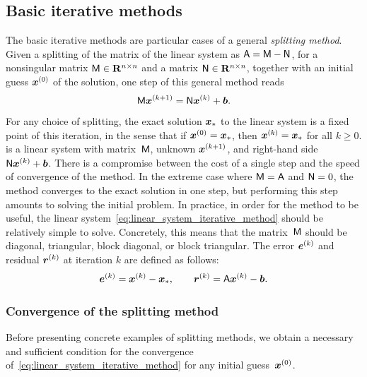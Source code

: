 \subsection{Basic iterative methods}%
\label{sub:basic_iterative_methods}
The basic iterative methods are particular cases of a general \emph{splitting method}.
Given a splitting of the matrix of the linear system as $\mathsf A = \mathsf M - \mathsf N$,
for a nonsingular matrix $\mathsf M \in \mathbf R^{n \times n}$ and a matrix $\mathsf N \in  \mathbf R^{n \times n}$,
together with an initial guess $\mathbf{\boldsymbol{x}}^{(0)}$ of the solution,
one step of this general method reads
\begin{equation}
    \label{eq:linear_system_iterative_method}
    \mathsf M \mathbf{\boldsymbol{x}}^{(k+1)} = \mathsf N \mathbf{\boldsymbol{x}}^{(k)} + \mathbf{\boldsymbol{b}}.
\end{equation}
For any choice of splitting,
the exact solution $\mathbf{\boldsymbol{x}}_*$ to the linear system is a fixed point of this iteration,
in the sense that if $\mathbf{\boldsymbol{x}}^{(0)} = \mathbf{\boldsymbol{x}}_*$, then $\mathbf{\boldsymbol{x}}^{(k)} = \mathbf{\boldsymbol{x}}_*$ for all $k \geq 0$.
 is a linear system with matrix~$\mathsf M$,
unknown $\mathbf{\boldsymbol{x}}^{(k+1)}$, and right-hand side $\mathsf N \mathbf{\boldsymbol{x}}^{(k)} + \mathbf{\boldsymbol{b}}$.
There is a compromise between the cost of a single step and the speed of convergence of the method.
In the extreme case where $\mathsf M = \mathsf A$ and $\mathsf N = 0$,
the method converges to the exact solution in one step,
but performing this step amounts to solving the initial problem.
In practice, in order for the method to be useful,
the linear system~\eqref{eq:linear_system_iterative_method} should be relatively simple to solve.
Concretely, this means that the matrix~$\mathsf M$ should be diagonal, triangular, block diagonal, or block triangular.
The error $\mathbf{\boldsymbol{e}}^{(k)}$ and residual $\mathbf{\boldsymbol{r}}^{(k)}$ at iteration $k$ are defined as follows:
\[
    \mathbf{\boldsymbol{e}}^{(k)} = \mathbf{\boldsymbol{x}}^{(k)} - \mathbf{\boldsymbol{x}}_*,
    \qquad
    \mathbf{\boldsymbol{r}}^{(k)} = \mathsf A \mathbf{\boldsymbol{x}}^{(k)} - \mathbf{\boldsymbol{b}}.
\]

\subsubsection{Convergence of the splitting method}%
\label{ssub:convergence_of_the_basic_splitting_method}
Before presenting concrete examples of splitting methods,
we obtain a necessary and sufficient condition for the convergence of~\eqref{eq:linear_system_iterative_method}
for any initial guess~$\mathbf{\boldsymbol{x}}^{(0)}$.

